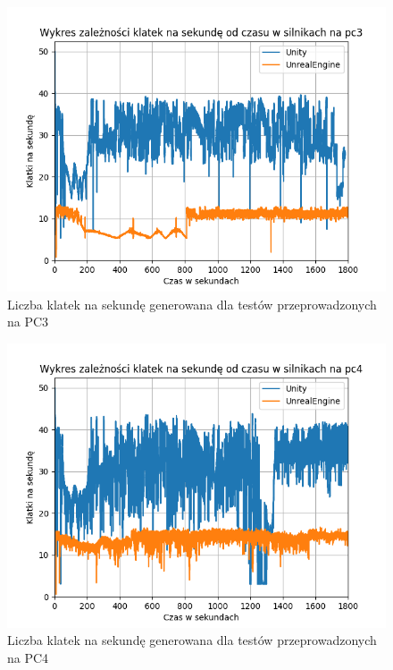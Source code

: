 \documentclass[12pt,twoside]{article}
\begin{document}
\begin{figure}[ht]
    \centering
    \includegraphics[width=16cm]{figures/FPSPlots/pc3searchedDataName.png}
    \caption{Liczba klatek na sekundę generowana dla testów przeprowadzonych na PC3}
    \label{Fig:PC3Tests}
\end{figure}        

\begin{figure}[ht]
    \centering
    \includegraphics[width=16cm]{figures/FPSPlots/pc4searchedDataName.png}
    \caption{Liczba klatek na sekundę generowana dla testów przeprowadzonych na PC4}
    \label{Fig:PC4Tests}
\end{figure}      
\end{document}
